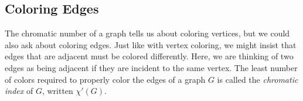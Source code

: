 \documentclass[12pt]{article}
\begin{document}
%
%
%
%  
%
%



\subsection{Coloring Edges}


The chromatic number of a graph tells us about coloring vertices, but we could also ask about coloring edges.  Just like with vertex coloring, we might insist that edges that are adjacent must be colored differently.  Here, we are thinking of two edges as being adjacent if they are incident to the same vertex.  The least number of colors required to properly color the edges of a graph $G$ is called the \emph{chromatic index} of $G$, written $\chi'(G)$.
\end{document}
